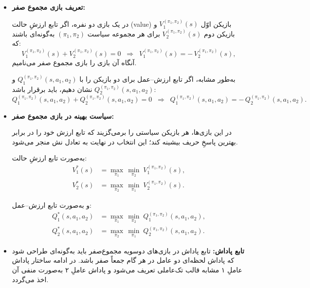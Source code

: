\begin{itemize}
	\item \textbf{تعریف بازی مجموع صفر:}
	
	در یک بازی دو نفره، اگر تابع ارزشِ حالت (value) بازیکن اوّل 
	\(V_1^{(\pi_1 ,\pi_2)}(s)\)
	و بازیکن دوم 
	\(V_2^{(\pi_1 ,\pi_2)}(s)\)
	برای هر مجموعه سیاست 
	\((\pi_1,\pi_2)\)
	به‌گونه‌ای باشند که:
	\begin{equation}\label{eq:game_v}
		V_1^{(\pi_1 ,\pi_2)}(s) + V_2^{(\pi_1 ,\pi_2)}(s) = 0 
		\;\;\Longrightarrow\;\;
		V_1^{(\pi_1 ,\pi_2)}(s) = -\,V_2^{(\pi_1 ,\pi_2)}(s),
	\end{equation}
	آنگاه آن بازی را {بازی مجموع صفر} می‌نامیم.
	
	به‌طور مشابه، اگر تابع ارزش–عمل برای دو بازیکن را با
	\(Q_1^{(\pi_1,\pi_2)}(s,a_1,a_2)\)
	و
	\(Q_2^{(\pi_1,\pi_2)}(s,a_1,a_2)\)
	نشان دهیم، باید برقرار باشد:
	\begin{equation}\label{eq:game_q}
		Q_1^{(\pi_1,\pi_2)}(s,a_1,a_2) + 
		Q_2^{(\pi_1,\pi_2)}(s,a_1,a_2) = 0
		\;\;\Longrightarrow\;\;
		Q_1^{(\pi_1,\pi_2)}(s,a_1,a_2) = -\,Q_2^{(\pi_1,\pi_2)}(s,a_1,a_2).
	\end{equation}
	
	\item \textbf{سیاست بهینه در بازی مجموع صفر:}
	
	در این بازی‌ها، هر بازیکن سیاستی را برمی‌گزیند که تابع ارزش خود را
	در برابر بهترین پاسخِ حریف بیشینه کند؛ این انتخاب در نهایت به
	تعادل نش منجر می‌شود.
	
	به‌صورت تابع ارزشِ حالت:
	\begin{align}
		V_1^*(s) &= \max_{\pi_1}\,\min_{\pi_2} \;
		V_1^{(\pi_1 ,\pi_2)}(s), \\
		V_2^*(s) &= \max_{\pi_2}\,\min_{\pi_1} \;
		V_2^{(\pi_1 ,\pi_2)}(s).
	\end{align}
	
	و به‌صورت تابع ارزش–عمل:
	\begin{align}
		Q_1^*(s,a_1,a_2) &= \max_{\pi_1}\,\min_{\pi_2} \;
		Q_1^{(\pi_1 ,\pi_2)}(s,a_1,a_2), \\
		Q_2^*(s,a_1,a_2) &= \max_{\pi_2}\,\min_{\pi_1} \;
		Q_2^{(\pi_1 ,\pi_2)}(s,a_1,a_2).
	\end{align}
	\item \textbf{تابع پاداش:}
	تابع پاداش
	در بازی‌های دوسویه مجموع‌صفر باید به‌گونه‌ای طراحی شود که پاداش لحظه‌ای دو عامل در هر گام جمعاً صفر باشد. در ادامه ساختار پاداش عاملِ ۱ مشابه قالب تک‌عاملی تعریف می‌شود و پاداش عاملِ ۲ به‌صورت منفی آن اخذ می‌گردد.
	

\end{itemize}
